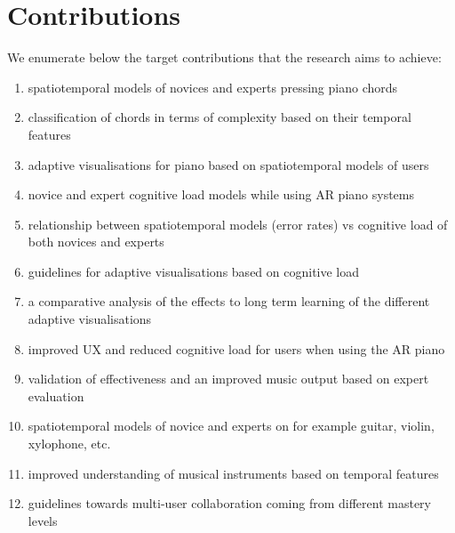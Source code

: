\documentclass[manuscript,screen]{acmart}
\begin{document}
\section{Contributions}
\label{sec:contri}
We enumerate below the target contributions that the research aims to achieve: 
\begin{enumerate}
    \item spatiotemporal models of novices and experts pressing piano chords
    \item classification of chords in terms of complexity based on their temporal features
    \item adaptive visualisations for piano based on spatiotemporal models of users
    \item novice and expert cognitive load models while using AR piano systems
    \item relationship between spatiotemporal models (error rates) vs cognitive load of both novices and experts
    \item guidelines for adaptive visualisations based on cognitive load
    \item a comparative analysis of the effects to long term learning of the different adaptive visualisations
    \item improved UX and reduced cognitive load for users when using the AR piano
    \item validation of effectiveness and an improved music output based on expert evaluation
    \item spatiotemporal models of novice and experts on for example guitar, violin, xylophone, etc.
    \item improved understanding of musical instruments based on temporal features
    \item guidelines towards multi-user collaboration coming from different mastery levels
\end{enumerate}
\end{document}
